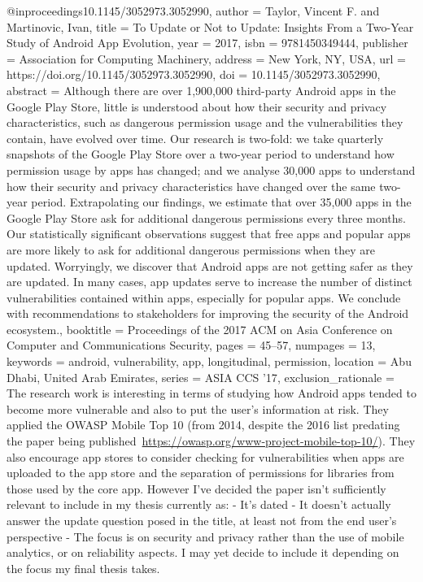 @inproceedings{10.1145/3052973.3052990,
    author = {Taylor, Vincent F. and Martinovic, Ivan},
    title = {To Update or Not to Update: Insights From a Two-Year Study of Android App Evolution},
    year = {2017},
    isbn = {9781450349444},
    publisher = {Association for Computing Machinery},
    address = {New York, NY, USA},
    url = {https://doi.org/10.1145/3052973.3052990},
    doi = {10.1145/3052973.3052990},
    abstract = {Although there are over 1,900,000 third-party Android apps in the Google Play Store,
    little is understood about how their security and privacy characteristics, such as
    dangerous permission usage and the vulnerabilities they contain, have evolved over
    time. Our research is two-fold: we take quarterly snapshots of the Google Play Store
    over a two-year period to understand how permission usage by apps has changed; and
    we analyse 30,000 apps to understand how their security and privacy characteristics
    have changed over the same two-year period. Extrapolating our findings, we estimate
    that over 35,000 apps in the Google Play Store ask for additional dangerous permissions
    every three months. Our statistically significant observations suggest that free apps
    and popular apps are more likely to ask for additional dangerous permissions when
    they are updated. Worryingly, we discover that Android apps are not getting safer
    as they are updated. In many cases, app updates serve to increase the number of distinct
    vulnerabilities contained within apps, especially for popular apps. We conclude with
    recommendations to stakeholders for improving the security of the Android ecosystem.},
    booktitle = {Proceedings of the 2017 ACM on Asia Conference on Computer and Communications Security},
    pages = {45–57},
    numpages = {13},
    keywords = {android, vulnerability, app, longitudinal, permission},
    location = {Abu Dhabi, United Arab Emirates},
    series = {ASIA CCS '17},
    exclusion_rationale = {
      The research work is interesting in terms of studying how Android apps tended to become more vulnerable and also to put the user's information at risk. They applied the OWASP Mobile Top 10 (from 2014, despite the 2016 list predating the paper being published~\url{https://owasp.org/www-project-mobile-top-10/}). They also encourage app stores to consider checking for vulnerabilities when apps are uploaded to the app store and the separation of permissions for libraries from those used by the core app. However I've decided the paper isn't sufficiently relevant to include in my thesis currently as:
      - It's dated
      - It doesn't actually answer the update question posed in the title, at least not from the end user's perspective
      - The focus is on security and privacy rather than the use of mobile analytics, or on reliability aspects.
      I may yet decide to include it depending on the focus my final thesis takes.
    }
}

